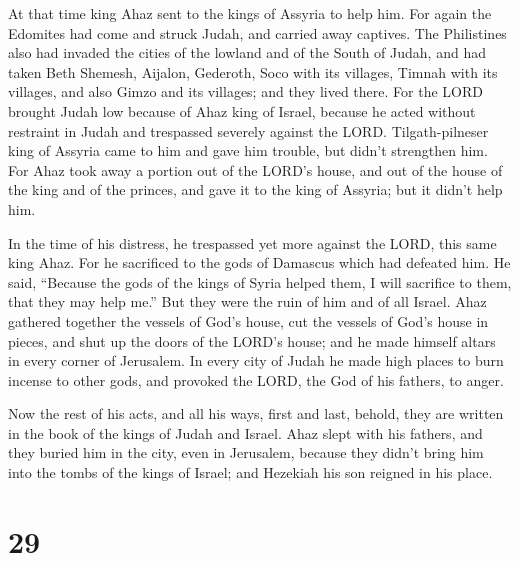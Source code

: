  At that time king Ahaz sent to the kings of Assyria to
help him.  For again the Edomites had come and struck
Judah, and carried away captives.  The Philistines also
had invaded the cities of the lowland and of the South of Judah, and had
taken Beth Shemesh, Aijalon, Gederoth, Soco with its villages, Timnah
with its villages, and also Gimzo and its villages; and they lived
there.  For the LORD brought Judah low because of Ahaz
king of Israel, because he acted without restraint in Judah and
trespassed severely against the LORD.  Tilgath-pilneser
king of Assyria came to him and gave him trouble, but didn't strengthen
him.  For Ahaz took away a portion out of the LORD's
house, and out of the house of the king and of the princes, and gave it
to the king of Assyria; but it didn't help him.

 In the time of his distress, he trespassed yet more
against the LORD, this same king Ahaz.  For he sacrificed
to the gods of Damascus which had defeated him. He said, ``Because the
gods of the kings of Syria helped them, I will sacrifice to them, that
they may help me.'' But they were the ruin of him and of all Israel.
 Ahaz gathered together the vessels of God's house, cut
the vessels of God's house in pieces, and shut up the doors of the
LORD's house; and he made himself altars in every corner of Jerusalem.
 In every city of Judah he made high places to burn
incense to other gods, and provoked the LORD, the God of his fathers, to
anger.

 Now the rest of his acts, and all his ways, first and
last, behold, they are written in the book of the kings of Judah and
Israel.  Ahaz slept with his fathers, and they buried him
in the city, even in Jerusalem, because they didn't bring him into the
tombs of the kings of Israel; and Hezekiah his son reigned in his place.

\hypertarget{section-28}{%
\section{29}\label{section-28}}

